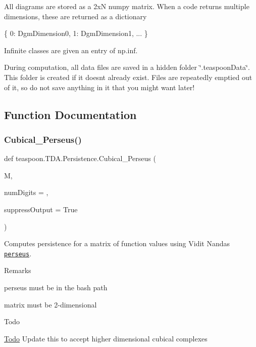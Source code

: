 All diagrams are stored as a 2xN numpy matrix. When a code returns multiple dimensions, these are returned as a dictionary 
\begin{DoxyCode}
\{
    0: DgmDimension0,
    1: DgmDimension1,
    ...
\}
\end{DoxyCode}
 Infinite classes are given an entry of np.\+inf.

During computation, all data files are saved in a hidden folder \char`\"{}.\+teaspoon\+Data\char`\"{}. This folder is created if it doesn\textquotesingle{}t already exist. Files are repeatedly emptied out of it, so do not save anything in it that you might want later! 

\subsection{Function Documentation}
\mbox{\label{namespaceteaspoon_1_1_t_d_a_1_1_persistence_aa583aa9a694aeaa3983e77319ac68e84}} 
\subsubsection{\texorpdfstring{Cubical\+\_\+\+Perseus()}{Cubical\_Perseus()}}
{\footnotesize\ttfamily def teaspoon.\+T\+D\+A.\+Persistence.\+Cubical\+\_\+\+Perseus (\begin{DoxyParamCaption}\item[{}]{M,  }\item[{}]{num\+Digits = {},  }\item[{}]{suppress\+Output = {\ttfamily True} }\end{DoxyParamCaption})}



Computes persistence for a matrix of function values using Vidit Nanda\textquotesingle{}s \href{http://people.maths.ox.ac.uk/nanda/perseus/index.html}{\tt perseus}. 

\begin{DoxyRemark}{Remarks}

\begin{DoxyItemize}
\item perseus must be in the bash path
\item matrix must be 2-\/dimensional
\end{DoxyItemize}
\end{DoxyRemark}
\begin{DoxyRefDesc}{Todo}
\item[\hyperlink{todo__todo000005}{Todo}]Update this to accept higher dimensional cubical complexes\end{DoxyRefDesc}



